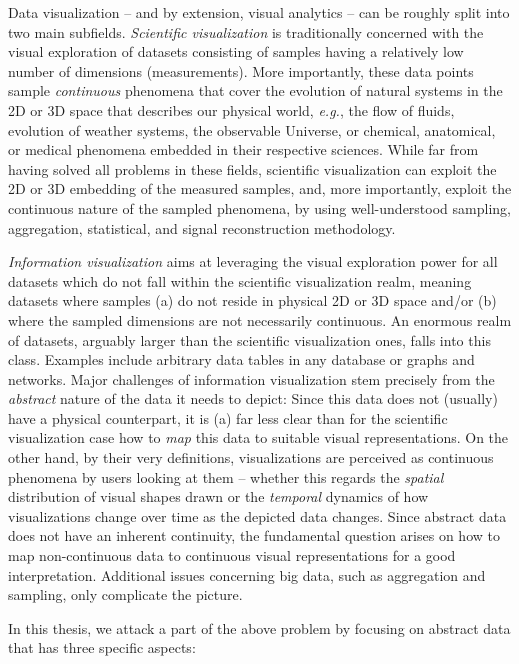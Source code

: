 Data visualization -- and by extension, visual analytics -- can be roughly split into two main subfields. \emph{Scientific visualization} is traditionally concerned with the visual exploration of datasets consisting of samples having a relatively low number of dimensions (measurements). More importantly, these data points sample \emph{continuous} phenomena that cover the evolution of natural systems in the 2D or 3D space that describes our physical world, \emph{e.g.}, the flow of fluids, evolution of weather systems, the observable Universe, or chemical, anatomical, or medical phenomena embedded in their respective sciences. While far from having solved all problems in these fields, scientific visualization can exploit the 2D or 3D embedding of the measured samples, and, more importantly, exploit the continuous nature of the sampled phenomena, by using well-understood sampling, aggregation, statistical, and signal reconstruction methodology.

\emph{Information visualization} aims at leveraging the visual exploration power for all datasets which do not fall within the scientific visualization realm, meaning datasets where samples (a) do not reside in physical 2D or 3D space and/or (b) where the sampled dimensions are not necessarily continuous. An enormous realm of datasets, arguably larger than the scientific visualization ones, falls into this class. Examples include arbitrary data tables in any database or graphs and networks. Major challenges of information visualization stem precisely from the \emph{abstract} nature of the data it needs to depict: Since this data does not (usually) have a physical counterpart, it is (a) far less clear than for the scientific visualization case how to \emph{map} this data to suitable visual representations. On the other hand, by their very definitions, visualizations are perceived as continuous phenomena by users looking at them -- whether this regards the \emph{spatial} distribution of visual shapes drawn or the \emph{temporal} dynamics of how visualizations change over time as the depicted data changes. Since abstract data does not have an inherent continuity, the fundamental question arises on how to map non-continuous data to continuous visual representations for a good interpretation. Additional issues concerning big data, such as aggregation and sampling, only complicate the picture.

In this thesis, we attack a part of the above problem by focusing on abstract data that has three specific aspects:


